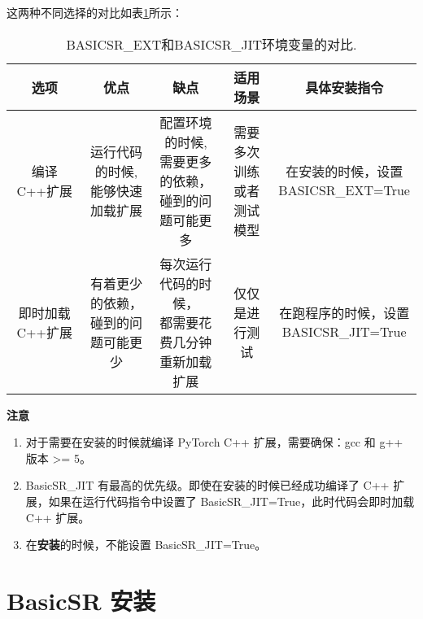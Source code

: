 \documentclass[../main.tex]{subfiles}
\begin{document}
这两种不同选择的对比如表\ref{tab:env}所示：

\begin{table}[h]
\centering
\footnotesize
\begin{tabular}{|c|c|c|c|c|}
  \hline
  选项                     & 优点                  & 缺点                            & 适用场景         & 具体安装指令 \\
  \hline
  编译C++扩展 & \makecell[c]{运行代码的时候, \\ 能够快速加载扩展} & \makecell*[c]{配置环境的时候, \\ 需要更多的依赖，\\碰到的问题可能更多} & \makecell[c]{需要多次训练 \\ 或者测试模型} & \makecell[c]{在安装的时候，设置 \\BASICSR\_EXT=True}\\
  \hline
  即时加载C++扩展 & \makecell[c]{有着更少的依赖，\\碰到的问题可能更少} & \makecell[c]{每次运行代码的时候，\\都需要花费几分钟\\重新加载扩展} & 仅仅是进行测试 & \makecell[c]{在跑程序的时候，设置 \\BASICSR\_JIT=True} \\
  \hline
\end{tabular}
\caption{\label{tab:env}BASICSR\_EXT和BASICSR\_JIT环境变量的对比.}
\end{table}


\begin{note} %
	\textbf{注意}

	\begin{enumerate}
	    \item 对于需要在安装的时候就编译 PyTorch C++ 扩展，需要确保：gcc 和 g++ 版本 >= 5。
	    \item BasicSR\_JIT 有最高的优先级。即使在安装的时候已经成功编译了 C++ 扩展，如果在运行代码指令中设置了 BasicSR\_JIT=True，此时代码会即时加载 C++ 扩展。
	    \item 在\textbf{安装}的时候，不能设置 BasicSR\_JIT=True。
	\end{enumerate}
\end{note}


\section{BasicSR 安装}
\end{document}
